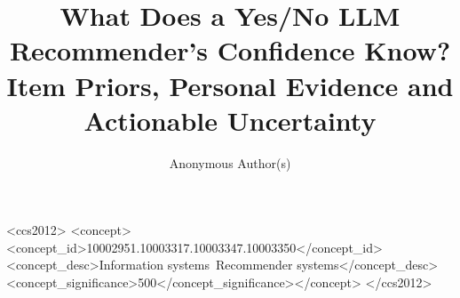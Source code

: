 \documentclass[sigconf,natbib=true,anonymous=true]{acmart}
\begin{document}
\title{What Does a Yes/No LLM Recommender's Confidence Know?\\
Item Priors, Personal Evidence and Actionable Uncertainty}

\author{Anonymous Author(s)}

\begin{abstract}

\end{abstract}

\begin{CCSXML}
<ccs2012>
<concept><concept_id>10002951.10003317.10003347.10003350</concept_id>
<concept_desc>Information systems~Recommender systems</concept_desc><concept_significance>500</concept_significance></concept>
</ccs2012>
\end{CCSXML}

\maketitle








\appendix




\end{document}
